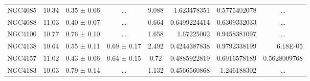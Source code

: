 \documentclass[reprint,%
 amsmath,amssymb,
 aps,
]{revtex4-1}
\begin{document}
\begin{table}[]
\begin{tabular}{cccccrrc}
\rowcolor[HTML]{F3F3F3} 
NGC4085              & 10.34                     & 0.35 ± 0.06           & …                      & 9.088                                                        & 1.623478351                                                           & 0.5775402078                                                          & …                                                             \\
\rowcolor[HTML]{F3F3F3} 
NGC4088              & 11.03                     & 0.40 ± 0.07           & …                      & 0.664                                                        & 0.6499224414                                                          & 0.6309332033                                                          & …                                                             \\
\rowcolor[HTML]{F3F3F3} 
NGC4100              & 10.77                     & 0.76 ± 0.10           & …                      & 1.658                                                        & 1.67225002                                                            & 0.9458381097                                                          & …                                                             \\
\rowcolor[HTML]{F3F3F3} 
NGC4138              & 10.64                     & 0.55 ± 0.11           & 0.69 ± 0.17            & 2.492                                                        & 0.4244387838                                                          & 0.9792338199                                                          & \multicolumn{1}{r}{\cellcolor[HTML]{F3F3F3}6.18E-05}          \\
\rowcolor[HTML]{F3F3F3} 
NGC4157              & 11.02                     & 0.43 ± 0.06           & 0.64 ± 0.15            & 0.72                                                         & 0.4885922819                                                          & 0.6916578189                                                          & \multicolumn{1}{r}{\cellcolor[HTML]{F3F3F3}0.5628009768}      \\
\rowcolor[HTML]{F3F3F3} 
NGC4183              & 10.03                     & 0.79 ± 0.14           & …                      & 1.132                                                        & 0.4566560868                                                          & 1.246188302                                                           & …                                                             \\

\end{tabular}
\end{table}
\end{document}
